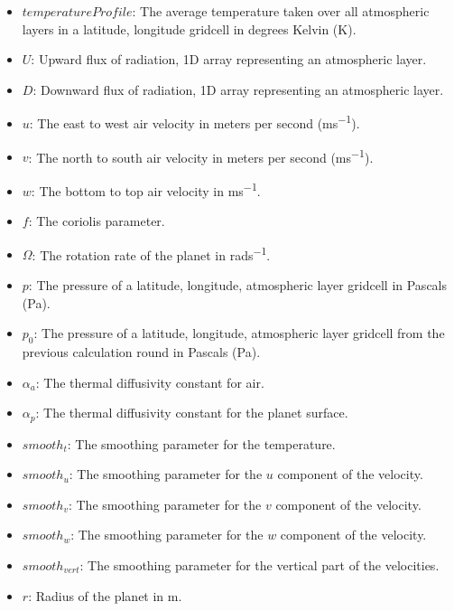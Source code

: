 \begin{itemize}
    \item $temperatureProfile$: The average temperature taken over all atmospheric layers in a latitude, longitude gridcell in degrees Kelvin (\si{K}).
    \item $U$: Upward flux of radiation, 1D array representing an atmospheric layer.
    \item $D$: Downward flux of radiation, 1D array representing an atmospheric layer.
    \item $u$: The east to west air velocity in meters per second (\si{ms^{-1}}).
    \item $v$: The north to south air velocity in meters per second (\si{ms^{-1}}).
    \item $w$: The bottom to top air velocity in \si{ms^{-1}}.
    \item $f$: The coriolis parameter.
    \item $\Omega$: The rotation rate of the planet in \si{rads^{-1}}.
    \item $p$: The pressure of a latitude, longitude, atmospheric layer gridcell in Pascals (\si{Pa}).
    \item $p_0$: The pressure of a latitude, longitude, atmospheric layer gridcell from the previous calculation round in Pascals (\si{Pa}).
    \item $\alpha_a$: The thermal diffusivity constant for air.
    \item $\alpha_p$: The thermal diffusivity constant for the planet surface.
    \item $smooth_t$: The smoothing parameter for the temperature.
    \item $smooth_u$: The smoothing parameter for the $u$ component of the velocity.
    \item $smooth_v$: The smoothing parameter for the $v$ component of the velocity.
    \item $smooth_w$: The smoothing parameter for the $w$ component of the velocity.
    \item $smooth_{vert}$: The smoothing parameter for the vertical part of the velocities.
    \item $r$: Radius of the planet in \si{m}.
\end{itemize}